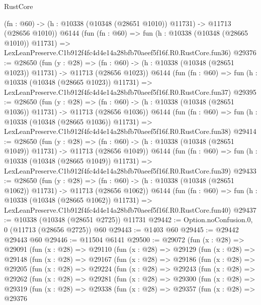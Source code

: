 \begin{lexlean}{RustCore}
\begin{coremodule}
    (fn : @60) -> (h : @10338 (@10348 (@28651 @1010)) @11731) -> @11713 (@28656 @1010))
    @6144
    (fun (fn : @60) =>
    fun (h : @10338 (@10348 (@28665 @1010)) @11731) =>
    LexLeanPreserve.C1b912f4fc4d4e14a28bfb70aeef5f16f.R0.RustCore.fun36)
@29376 := @28650
    (fun (y : @28) =>
    (fn : @60) -> (h : @10338 (@10348 (@28651 @1023)) @11731) -> @11713 (@28656 @1023))
    @6144
    (fun (fn : @60) =>
    fun (h : @10338 (@10348 (@28665 @1023)) @11731) =>
    LexLeanPreserve.C1b912f4fc4d4e14a28bfb70aeef5f16f.R0.RustCore.fun37)
@29395 := @28650
    (fun (y : @28) =>
    (fn : @60) -> (h : @10338 (@10348 (@28651 @1036)) @11731) -> @11713 (@28656 @1036))
    @6144
    (fun (fn : @60) =>
    fun (h : @10338 (@10348 (@28665 @1036)) @11731) =>
    LexLeanPreserve.C1b912f4fc4d4e14a28bfb70aeef5f16f.R0.RustCore.fun38)
@29414 := @28650
    (fun (y : @28) =>
    (fn : @60) -> (h : @10338 (@10348 (@28651 @1049)) @11731) -> @11713 (@28656 @1049))
    @6144
    (fun (fn : @60) =>
    fun (h : @10338 (@10348 (@28665 @1049)) @11731) =>
    LexLeanPreserve.C1b912f4fc4d4e14a28bfb70aeef5f16f.R0.RustCore.fun39)
@29433 := @28650
    (fun (y : @28) =>
    (fn : @60) -> (h : @10338 (@10348 (@28651 @1062)) @11731) -> @11713 (@28656 @1062))
    @6144
    (fun (fn : @60) =>
    fun (h : @10338 (@10348 (@28665 @1062)) @11731) =>
    LexLeanPreserve.C1b912f4fc4d4e14a28bfb70aeef5f16f.R0.RustCore.fun40)
@29437 := @10338 (@10348 (@28651 @2725)) @11731
@29442 := Option.noConfusion.{0, 0} (@11713 (@28656 @2725)) @60
@29443 := @1403 @60
@29445 := @29442 @29443 @60
@29446 := @11504 @6141
@29500 := @29072
    (fun (x : @28) =>
    @29091
      (fun (x : @28) =>
      @29110
        (fun (x : @28) =>
        @29129
          (fun (x : @28) =>
          @29148
            (fun (x : @28) =>
            @29167
              (fun (x : @28) =>
              @29186
                (fun (x : @28) =>
                @29205
                  (fun (x : @28) =>
                  @29224
                    (fun (x : @28) =>
                    @29243
                      (fun (x : @28) =>
                      @29262
                        (fun (x : @28) =>
                        @29281
                          (fun (x : @28) =>
                          @29300
                            (fun (x : @28) =>
                            @29319
                              (fun (x : @28) =>
                              @29338
                                (fun (x : @28) =>
                                @29357
                                  (fun (x : @28) =>
                                  @29376

\end{coremodule}
\end{lexlean}
